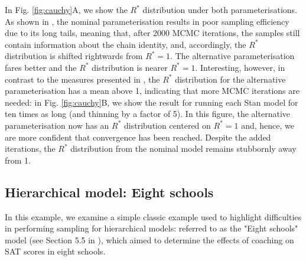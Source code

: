\documentclass{article}
\begin{document}
In Fig. \ref{fig:cauchy}A, we show the $R^*$ distribution under both parameterisations. As shown in \cite{vehtari2019rank}, the nominal parameterisation results in poor sampling efficiency due to its long tails, meaning that, after 2000 MCMC iterations, the samples still contain information about the chain identity, and, accordingly, the $R^*$ distribution is shifted rightwards from $R^*=1$. The alternative parameterisation fares better and the $R^*$ distribution is nearer $R^*=1$. Interesting, however, in contrast to the measures presented in \cite{vehtari2019rank}, the $R^*$ distribution for the alternative parameterisation has a mean above 1, indicating that more MCMC iterations are needed: in Fig. \ref{fig:cauchy}B, we show the result for running each Stan model for ten times as long (and thinning by a factor of 5). In this figure, the alternative parameterisation now has an $R^*$ distribution centered on $R^*=1$ and, hence, we are more confident that convergence has been reached. Despite the added iterations, the $R^*$ distribution from the nominal model remains stubbornly away from 1.


\subsection{Hierarchical model: Eight schools}
In this example, we examine a simple classic example used to highlight difficulties in performing sampling for hierarchical models: referred to as the "Eight schools" model (see Section 5.5 in \cite{gelman2013bayesian}), which aimed to determine the effects of coaching on SAT scores in eight schools. 
\end{document}
